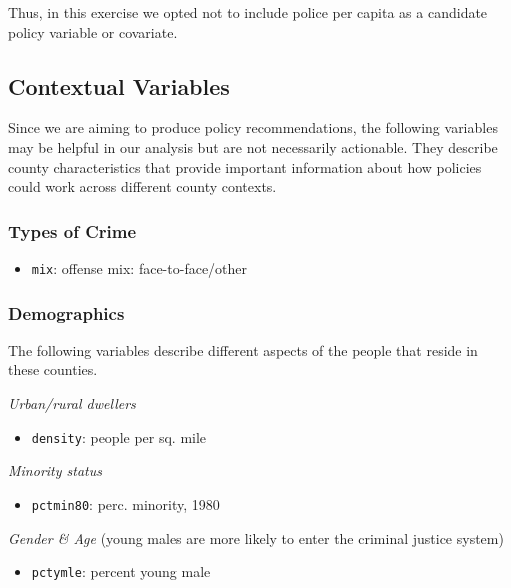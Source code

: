 \documentclass[]{article}
\providecommand{\tightlist}{%
  \setlength{\itemsep}{0pt}\setlength{\parskip}{0pt}}
\begin{document}
Thus, in this exercise we opted not to include police per capita as a
candidate policy variable or covariate.

\hypertarget{contextual-variables}{%
\subsection{Contextual Variables}\label{contextual-variables}}

Since we are aiming to produce policy recommendations, the following
variables may be helpful in our analysis but are not necessarily
actionable. They describe county characteristics that provide important
information about how policies could work across different county
contexts.

\hypertarget{types-of-crime}{%
\subsubsection{Types of Crime}\label{types-of-crime}}

\begin{itemize}
\tightlist
\item
  \texttt{mix}: offense mix: face-to-face/other
\end{itemize}

\hypertarget{demographics}{%
\subsubsection{Demographics}\label{demographics}}

The following variables describe different aspects of the people that
reside in these counties.

\emph{Urban/rural dwellers}

\begin{itemize}
\tightlist
\item
  \texttt{density}: people per sq. mile
\end{itemize}

\emph{Minority status}

\begin{itemize}
\tightlist
\item
  \texttt{pctmin80}: perc. minority, 1980
\end{itemize}

\emph{Gender \& Age} (young males are more likely to enter the criminal
justice system)

\begin{itemize}
\tightlist
\item
  \texttt{pctymle}: percent young male
\end{itemize}
\end{document}
